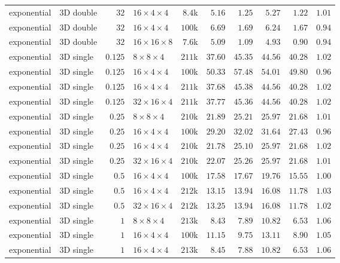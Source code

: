 {\begin{longtable}{llrlrrrrrr}
    exponential & 3D double & $32$ & $16{\times}4{\times}4$ & $8.4$k & $5.16$ & $1.25$ & $5.27$ & $1.22$ & $1.01$ \\
    exponential & 3D double & $32$ & $16{\times}4{\times}4$ & $100$k & $6.69$ & $1.69$ & $6.24$ & $1.67$ & $0.94$ \\
    exponential & 3D double & $32$ & $16{\times}16{\times}8$ & $7.6$k & $5.09$ & $1.09$ & $4.93$ & $0.90$ & $0.94$ \\
    \midrule
    exponential & 3D single & $0.125$ & $8{\times}8{\times}4$ & $211$k & $37.60$ & $45.35$ & $44.56$ & $40.28$ & $1.02$ \\
    exponential & 3D single & $0.125$ & $16{\times}4{\times}4$ & $100$k & $50.33$ & $57.48$ & $54.01$ & $49.80$ & $0.96$ \\
    exponential & 3D single & $0.125$ & $16{\times}4{\times}4$ & $211$k & $37.68$ & $45.38$ & $44.56$ & $40.28$ & $1.02$ \\
    exponential & 3D single & $0.125$ & $32{\times}16{\times}4$ & $211$k & $37.77$ & $45.36$ & $44.56$ & $40.28$ & $1.02$ \\
    exponential & 3D single & $0.25$ & $8{\times}8{\times}4$ & $210$k & $21.89$ & $25.21$ & $25.97$ & $21.68$ & $1.01$ \\
    exponential & 3D single & $0.25$ & $16{\times}4{\times}4$ & $100$k & $29.20$ & $32.02$ & $31.64$ & $27.43$ & $0.96$ \\
    exponential & 3D single & $0.25$ & $16{\times}4{\times}4$ & $210$k & $21.78$ & $25.10$ & $25.97$ & $21.68$ & $1.02$ \\
    exponential & 3D single & $0.25$ & $32{\times}16{\times}4$ & $210$k & $22.07$ & $25.26$ & $25.97$ & $21.68$ & $1.01$ \\
    exponential & 3D single & $0.5$ & $16{\times}4{\times}4$ & $100$k & $17.58$ & $17.67$ & $19.76$ & $15.55$ & $1.00$ \\
    exponential & 3D single & $0.5$ & $16{\times}4{\times}4$ & $212$k & $13.15$ & $13.94$ & $16.08$ & $11.78$ & $1.03$ \\
    exponential & 3D single & $0.5$ & $32{\times}16{\times}4$ & $212$k & $13.25$ & $13.94$ & $16.08$ & $11.78$ & $1.02$ \\
    exponential & 3D single & $1$ & $8{\times}8{\times}4$ & $213$k & $8.43$ & $7.89$ & $10.82$ & $6.53$ & $1.06$ \\
    exponential & 3D single & $1$ & $16{\times}4{\times}4$ & $100$k & $11.15$ & $9.75$ & $13.11$ & $8.90$ & $1.05$ \\
    exponential & 3D single & $1$ & $16{\times}4{\times}4$ & $213$k & $8.45$ & $7.88$ & $10.82$ & $6.53$ & $1.06$ \\

\end{longtable}}
